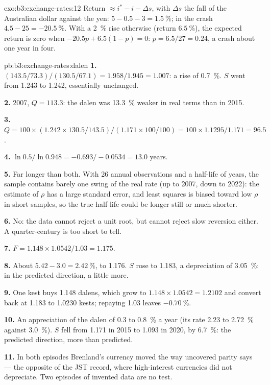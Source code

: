 \begin{solution}{exo:b3:exchange-rates:12}
Return $\approx i^* - i - \Delta s$, with $\Delta s$ the fall of the Australian dollar against the yen:
$5 - 0.5 - 3 = 1.5~\%$; in the crash $4.5 - 25 = -20.5~\%$. With a 2~\% rise otherwise
(return $6.5~\%$), the expected return is zero when $-20.5p + 6.5(1 - p) = 0$: $p = 6.5/27 =
0.24$, a crash about one year in four.
\end{solution}

\begin{solution}{pb:b3:exchange-rates:dalen}
\textbf{1.} $(143.5/73.3)/(130.5/67.1) = 1.958/1.945 = 1.007$: a rise of 0.7~\%. $S$ went
from 1.243 to 1.242, essentially unchanged. %

\textbf{2.} 2007, $Q = 113.3$: the dalen was 13.3~\% weaker in real terms than in 2015.

\textbf{3.} $Q = 100 \times (1.242 \times 130.5/143.5)/(1.171 \times 100/100) = 100 \times 1.1295/1.171 = 96.5$.

\textbf{4.} $\ln 0.5/\ln 0.948 = -0.693/-0.0534 = 13.0$ years.

\textbf{5.} Far longer than both. With 26 annual observations and a half-life of
years, the sample contains barely one swing of the real rate (up to 2007, down to
2022): the estimate of $\rho$ has a large standard error, and least squares is biased
toward low $\rho$ in short samples, so the true half-life could be longer still or
much shorter.

\textbf{6.} No: the data cannot reject a unit root, but cannot reject slow reversion
either. A quarter-century is too short to tell.

\textbf{7.} $F = 1.148 \times 1.0542/1.03 = 1.175$.

\textbf{8.} About $5.42 - 3.0 = 2.42~\%$, to 1.176. $S$ rose to 1.183, a depreciation of 3.05~\%:
in the predicted direction, a little more.

\textbf{9.} One kest buys 1.148 dalens, which grow to $1.148 \times 1.0542 = 1.2102$ and convert
back at 1.183 to 1.0230 kests; repaying 1.03 leaves $-0.70~\%$.

\textbf{10.} An appreciation of the dalen of 0.3 to 0.8~\% a year (its rate 2.23 to 2.72~\%
against 3.0~\%). $S$ fell from 1.171 in 2015 to 1.093 in 2020, by 6.7~\%:
the predicted direction, more than predicted.

\textbf{11.} In both episodes Brenland's currency moved the way uncovered parity
says --- the opposite of the JST record, where high-interest currencies did not
depreciate. Two episodes of invented data are no test.


\end{solution}
